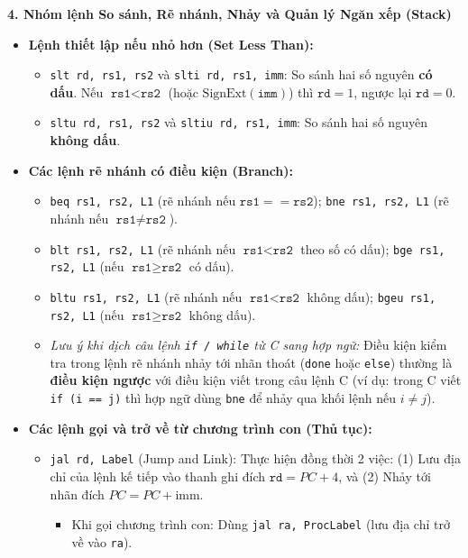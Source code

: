 \textbf{4. Nhóm lệnh So sánh, Rẽ nhánh, Nhảy và Quản lý Ngăn xếp (Stack)}
\begin{itemize}
    \item \textbf{Lệnh thiết lập nếu nhỏ hơn (Set Less Than):}
    \begin{itemize}
        \item \texttt{slt rd, rs1, rs2} và \texttt{slti rd, rs1, imm}: So sánh hai số nguyên \textbf{có dấu}. Nếu $\texttt{rs1} < \texttt{rs2}$ (hoặc $\text{SignExt}(\texttt{imm})$) thì $\texttt{rd} = 1$, ngược lại $\texttt{rd} = 0$.
        \item \texttt{sltu rd, rs1, rs2} và \texttt{sltiu rd, rs1, imm}: So sánh hai số nguyên \textbf{không dấu}.
    \end{itemize}
    \item \textbf{Các lệnh rẽ nhánh có điều kiện (Branch):}
    \begin{itemize}
        \item \texttt{beq rs1, rs2, L1} (rẽ nhánh nếu $\texttt{rs1} == \texttt{rs2}$); \quad \texttt{bne rs1, rs2, L1} (rẽ nhánh nếu $\texttt{rs1} \neq \texttt{rs2}$).
        \item \texttt{blt rs1, rs2, L1} (rẽ nhánh nếu $\texttt{rs1} < \texttt{rs2}$ theo số có dấu); \quad \texttt{bge rs1, rs2, L1} (nếu $\texttt{rs1} \ge \texttt{rs2}$ có dấu).
        \item \texttt{bltu rs1, rs2, L1} (rẽ nhánh nếu $\texttt{rs1} < \texttt{rs2}$ không dấu); \quad \texttt{bgeu rs1, rs2, L1} (nếu $\texttt{rs1} \ge \texttt{rs2}$ không dấu).
        \item \textit{Lưu ý khi dịch câu lệnh \texttt{if / while} từ C sang hợp ngữ:} Điều kiện kiểm tra trong lệnh rẽ nhánh nhảy tới nhãn thoát (\texttt{done} hoặc \texttt{else}) thường là \textbf{điều kiện ngược} với điều kiện viết trong câu lệnh C (ví dụ: trong C viết \texttt{if (i == j)} thì hợp ngữ dùng \texttt{bne} để nhảy qua khối lệnh nếu $i \neq j$).
    \end{itemize}
    \item \textbf{Các lệnh gọi và trở về từ chương trình con (Thủ tục):}
    \begin{itemize}
        \item \texttt{jal rd, Label} (Jump and Link): Thực hiện đồng thời 2 việc: (1) Lưu địa chỉ của lệnh kế tiếp vào thanh ghi đích $\texttt{rd} = PC + 4$, và (2) Nhảy tới nhãn đích $PC = PC + \text{imm}$.
        \begin{itemize}
            \item Khi gọi chương trình con: Dùng \texttt{jal ra, ProcLabel} (lưu địa chỉ trở về vào \texttt{ra}).

\end{itemize}
\end{itemize}
\end{itemize}
